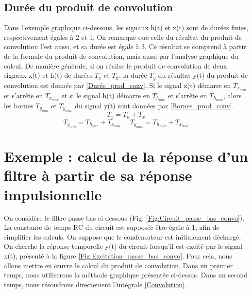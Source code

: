 	
	\subsection{Durée du produit de convolution}
	
	Dans l'exemple graphique ci-dessous, les signaux h(t) et x(t) sont de durées finies, respectivement égales à 2 et 1. On remarque que celle du résultat du produit de convolution l'est aussi, et sa durée est égale à 3.
	Ce résultat se comprend à partir de la formule du produit de convolution, mais aussi par l'analyse graphique du calcul. De manière générale, si on réalise le produit de convolution de deux signaux x(t) et h(t) de durées $T_{x}$ et $T_{h}$, la durée $T_{y}$ du résultat y(t) du produit de convolution est donnée par \ref{Durée_prod_conv}. Si le signal x(t) démarre en $T_{x_{min}}$ et s'arrête en $T_{x_{max}}$ et si le signal h(t) démarre en $T_{h_{min}}$ et s'arrête en $T_{h_{max}}$, alors les bornes $T_{y_{min}}$ et  $T_{y_{max}}$ du signal y(t) sont données par \ref{Bornes_prod_conv}.  
	\begin{equation}\label{Durée_prod_conv}
	T_{y}=T_{h}+T_{x}
	\end{equation} 
	\begin{equation}\label{Bornes_prod_conv}
	T_{y_{min}}=T_{h_{min}}+T_{x_{min}}~~~~~~T_{y_{max}}=T_{h_{max}}+T_{x_{max}}
	\end{equation}
	
	\vspace{1\baselineskip}
	
	

	
	
	\section{Exemple : calcul de la réponse d'un filtre à partir de sa réponse impulsionnelle}
	
	On considère le filtre passe-bas ci-dessous (Fig. \ref{Fig:Circuit_passe_bas_convo}). La constante de temps RC du circuit est supposée être égale à 1, afin de simplifier les calculs. On suppose que le condensateur est initialement déchargé. On cherche la réponse temporelle y(t) du circuit lorsqu'il est excité par le signal x(t), présenté à la figure \ref{Fig:Excitation_passe_bas_convo}. Pour cela, nous allons mettre en œuvre le calcul du produit de convolution. Dans un premier temps, nous utiliserons la méthode graphique présentée ci-dessus. Dans un second temps, nous résoudrons directement l'intégrale \ref{Convolution}.
	
